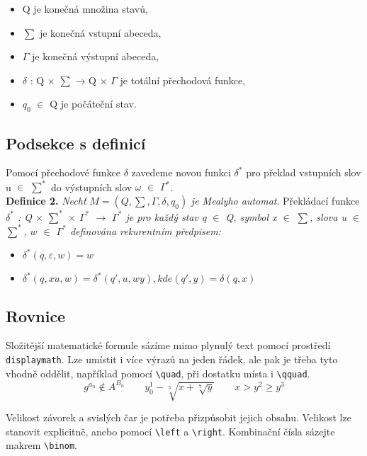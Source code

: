 \documentclass[a4paper, twocolumn, 11pt]{article}
\begin{document}
\begin{itemize}
\item Q je konečná množina stavů,
\item $\sum$ je konečná vstupní abeceda,
\item $\Gamma$ je konečná výstupní abeceda,
\item $\delta$ : Q × $\sum$ → Q × $\Gamma$ je totální přechodová funkce,
\item $q_0$ $\in$ Q je počáteční stav.
\end{itemize}

\subsection{Podsekce s definicí}

Pomocí přechodové funkce $\delta$ zavedeme novou funkci $\delta^*$
pro překlad vstupních slov u $\in$ $\sum^*$ do výstupních slov
$\omega$ $\in$ $\Gamma^*$. \\
\textbf{Definice 2.} \textit{Nechť} $M = (Q, \sum, \Gamma, \delta, q_0)$ \textit{je Mea\-ly\-ho
automat}. Překládací funkce \textit{$\delta^*$ : Q $\times$ $\sum^*$ $\times$  $\Gamma^*$ $\rightarrow$ $\Gamma^*$
je pro každý stav q $\in$ Q, symbol x $\in$ $\sum$, slova u $\in$ $\sum^*$,
$w$ $\in$ $\Gamma^*$ definována rekurentním předpisem:}

\begin{itemize}
\item $\delta^*(q,\varepsilon, w) = w$
\item $\delta^*(q,xu,w) = \delta^*(q',u,wy), kde (q',y) = \delta(q,x)$
\end{itemize}

\subsection{Rovnice}
Složitější matematické formule sázíme mimo plynulý
text pomocí prostředí \texttt{displaymath}. Lze umístit i více
výrazů na jeden řádek, ale pak je třeba tyto vhodně
oddělit, například pomocí \verb|\quad|, při dostatku místa
i \verb|\qquad|.
\begin{displaymath}
    g^{a_n} \notin A^{B_n} \qquad y^1_0 - \sqrt[5]{x + \sqrt[7]{y}}\qquad x > y^2 \geq y^3
\end{displaymath}

Velikost závorek a svislých čar je potřeba přizpůsobit jejich obsahu. Velikost lze stanovit explicitně,
anebo pomocí \verb|\left| a \verb|\right|. Kombinační čísla sázejte makrem \verb|\binom|.
\end{document}
